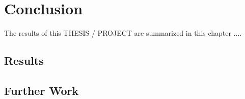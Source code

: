 \chapter{Conclusion}
\label{ch:conclusion}
The results of this THESIS / PROJECT are summarized in this chapter ....

\section{Results}


\section{Further Work}
